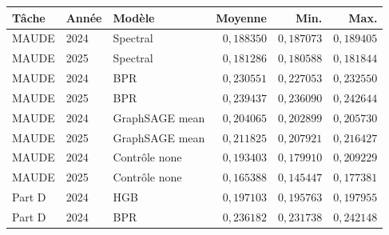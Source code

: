 \begin{tabularx}{\linewidth}{@{}llXrrr@{}}
\toprule
Tâche & Année & Modèle & Moyenne & Min. & Max. \\
\midrule
MAUDE & 2024 & Spectral & $0{,}188350$ & $0{,}187073$ & $0{,}189405$ \\
MAUDE & 2025 & Spectral & $0{,}181286$ & $0{,}180588$ & $0{,}181844$ \\
MAUDE & 2024 & BPR & $0{,}230551$ & $0{,}227053$ & $0{,}232550$ \\
MAUDE & 2025 & BPR & $0{,}239437$ & $0{,}236090$ & $0{,}242644$ \\
MAUDE & 2024 & GraphSAGE mean & $0{,}204065$ & $0{,}202899$ & $0{,}205730$ \\
MAUDE & 2025 & GraphSAGE mean & $0{,}211825$ & $0{,}207921$ & $0{,}216427$ \\
MAUDE & 2024 & Contrôle none & $0{,}193403$ & $0{,}179910$ & $0{,}209229$ \\
MAUDE & 2025 & Contrôle none & $0{,}165388$ & $0{,}145447$ & $0{,}177381$ \\
Part D & 2024 & HGB & $0{,}197103$ & $0{,}195763$ & $0{,}197955$ \\
Part D & 2024 & BPR & $0{,}236182$ & $0{,}231738$ & $0{,}242148$ \\
\bottomrule
\end{tabularx}
